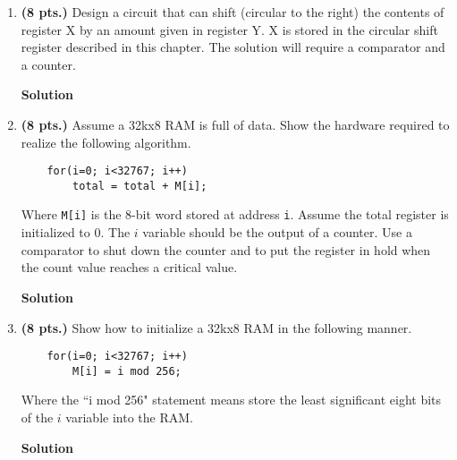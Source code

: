 \begin{enumerate}
    \item\textbf{ (8 pts.)} Design a circuit that can shift (circular
        to the right) the contents of register X by an amount given in
        register Y. X is stored in the circular shift register described
        in this chapter. The solution will require a comparator and a
        counter.
        \begin{onlysolution}  \textbf{Solution} \itshape{
                \begin{figure}[ht]
                \end{figure}
            }
        \end{onlysolution}

    \item\textbf{ (8 pts.)} Assume a 32kx8 RAM is full of data. Show
        the hardware required to realize the following algorithm.
\begin{verbatim}
    for(i=0; i<32767; i++)
        total = total + M[i];
\end{verbatim}

        Where \verb+M[i]+ is the 8-bit word stored at address \verb^i^.
        Assume the total register is initialized to 0. The $i$ variable should
        be the output of a counter. Use a comparator to shut down the counter
        and to put the register in hold when the count value reaches a critical
        value.
        \begin{onlysolution}  \textbf{Solution} \itshape{
                \begin{figure}[ht]
                \end{figure}
            }
        \end{onlysolution}

    \item\textbf{ (8 pts.)} Show how to initialize a 32kx8 RAM in the following manner.
\begin{verbatim}
    for(i=0; i<32767; i++)
        M[i] = i mod 256;
\end{verbatim}

        Where the ``i mod 256" statement means store the least significant
        eight bits of the $i$ variable into the RAM.

        \begin{onlysolution}  \textbf{Solution} \itshape{
                \begin{figure}[ht]
                \end{figure}
            }
        \end{onlysolution}


\end{enumerate}
